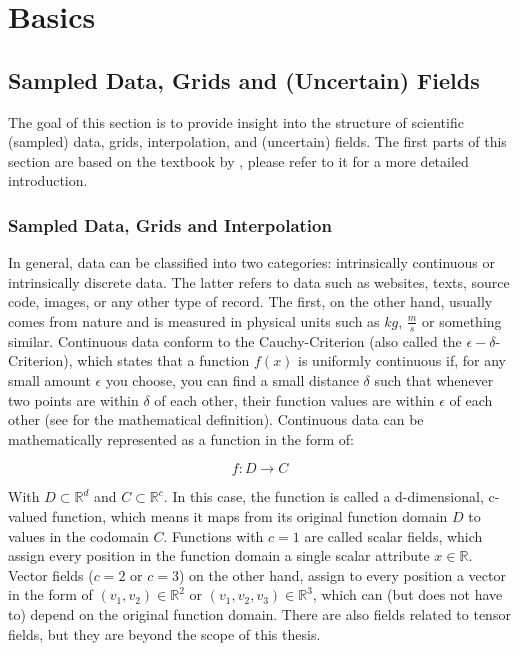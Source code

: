 


\chapter{Basics}
\label{ch:basics}


\section{Sampled Data, Grids and (Uncertain) Fields}
\label{sec:uncertainfields}

The goal of this section is to provide insight into the structure of scientific (sampled) data, grids, interpolation, and (uncertain) fields. 
The first parts of this section are based on the textbook by , please refer to it for a more detailed introduction. 

\subsection{Sampled Data, Grids and Interpolation}

In general, data can be classified into two categories: intrinsically continuous or intrinsically discrete data. 
The latter refers to data such as websites, texts, source code, images, or any other type of record. 
The first, on the other hand, usually comes from nature and is measured in physical units such as $kg$, $\frac{m}{s}$ or something similar.
Continuous data conform to the Cauchy-Criterion (also called the $\epsilon - \delta$-Criterion), which states that a function $f(x)$ is uniformly continuous if, for any small amount $\epsilon$ you choose, you can find a small distance $\delta$ such that whenever two points are within $\delta$ of each other, their function values are within $\epsilon$ of each other (see \cite{telea2014data} for the mathematical definition). 
Continuous data can be mathematically represented as a function in the form of:

\begin{equation}
  f: D \rightarrow C
  \label{eq:continous data}
\end{equation}

With $D \subset \mathbb{R}^d$ and $C \subset \mathbb{R}^c$. 
In this case, the function is called a d-dimensional, c-valued function, which means it maps from its original function domain $D$ to values in the codomain $C$. 
Functions with $c=1$ are called scalar fields, which assign every position in the function domain a single scalar attribute $x \in \mathbb{R}$. 
Vector fields ($c=2$ or $c=3$) on the other hand, assign to every position a vector in the form of $(v_1, v_2) \in \mathbb{R}^2$ or $(v_1, v_2, v_3) \in \mathbb{R}^3$, which can (but does not have to) depend on the original function domain. 
There are also fields related to tensor fields, but they are beyond the scope of this thesis. 

